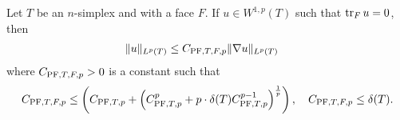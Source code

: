 \documentclass[a4paper]{article}
\begin{document}
\begin{lemma}\label{lemma:mixedbconsimplex}
    Let $T$ be an $n$-simplex and with a face $F$. 
    If $u \in W^{1,p}(T)$ such that $\operatorname{tr}_{F} u = 0$, then 
    \begin{align*}
        \| u \|_{L^{p}(T)}
        &
        \leq 
        C_{{\rm PF},T,F,p} \| \nabla u \|_{L^{p}(T)}
    \end{align*}
    where $C_{{\rm PF},T,F,p} > 0$ is a constant such that 
    \begin{align*}
        C_{{\rm PF},T,F,p}
        \leq 
        \left( C_{{\rm PF},T,p} + \left( C_{{\rm PF},T,p}^{p} + p \cdot {\delta}(T) C_{{\rm PF},T,p}^{p-1} \right)^{\frac 1 p} \right),  
        \quad 
        C_{{\rm PF},T,F,p}
        \leq 
        {\delta}(T)
        .
    \end{align*}
\end{lemma}
\end{document}
